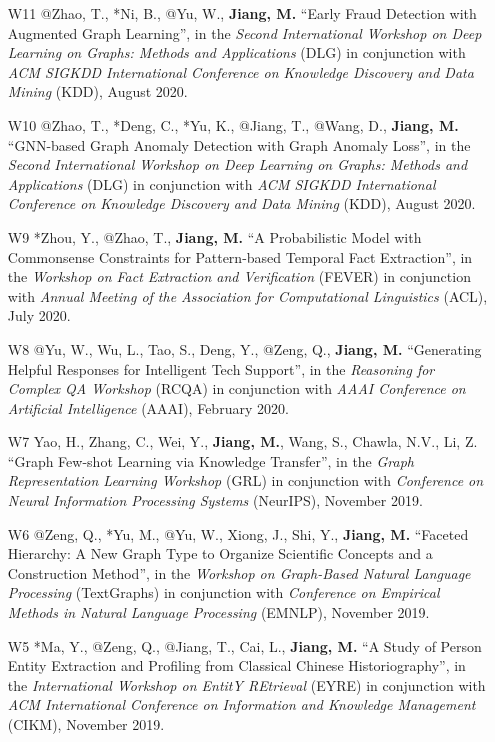\documentclass[10pt]{article}
\newenvironment{myindentpar}[1]%
{\begin{list}{}%
         {\setlength{\leftmargin}{#1}}%
         \item[]%
}
{\end{list}}
\newcounter{list}
\begin{document}
\begin{myindentpar}{0.00cm}
\begin{enumerate}[leftmargin=.5cm]
\item[W11] @Zhao, T., *Ni, B., @Yu, W., \textbf{Jiang, M.} ``Early Fraud Detection with Augmented Graph Learning'', in the \textit{Second International Workshop on Deep Learning on Graphs: Methods and Applications} (DLG) in conjunction with \textit{ACM SIGKDD International Conference on Knowledge Discovery and Data Mining} (KDD), August 2020.

\item[W10] @Zhao, T., *Deng, C., *Yu, K., @Jiang, T., @Wang, D., \textbf{Jiang, M.} ``GNN-based Graph Anomaly Detection with Graph Anomaly Loss'', in the \textit{Second International Workshop on Deep Learning on Graphs: Methods and Applications} (DLG) in conjunction with \textit{ACM SIGKDD International Conference on Knowledge Discovery and Data Mining} (KDD), August 2020.

\item[W9] *Zhou, Y., @Zhao, T., \textbf{Jiang, M.} ``A Probabilistic Model with Commonsense Constraints for Pattern-based Temporal Fact Extraction'', in the \textit{Workshop on Fact Extraction and Verification} (FEVER) in conjunction with \textit{Annual Meeting of the Association for Computational Linguistics} (ACL), July 2020.

\item[W8] @Yu, W., Wu, L., Tao, S., Deng, Y., @Zeng, Q., \textbf{Jiang, M.} ``Generating Helpful Responses for Intelligent Tech Support'', in the \textit{Reasoning for Complex QA  Workshop} (RCQA) in conjunction with \textit{AAAI Conference on Artificial Intelligence} (AAAI), February 2020.

\item[W7] Yao, H., Zhang, C., Wei, Y., \textbf{Jiang, M.}, Wang, S., Chawla, N.V., Li, Z. ``Graph Few-shot Learning via Knowledge Transfer'', in the \textit{Graph Representation Learning Workshop} (GRL) in conjunction with \textit{Conference on Neural Information Processing Systems} (NeurIPS), November 2019.
	
\item[W6] @Zeng, Q., *Yu, M., @Yu, W., Xiong, J., Shi, Y., \textbf{Jiang, M.} ``Faceted Hierarchy: A New Graph Type to Organize Scientific Concepts and a Construction Method'', in the \textit{Workshop on Graph-Based Natural Language Processing} (TextGraphs) in conjunction with \textit{Conference on Empirical Methods in Natural Language Processing} (EMNLP), November 2019.

\item[W5] *Ma, Y., @Zeng, Q., @Jiang, T., Cai, L., \textbf{Jiang, M.} ``A Study of Person Entity Extraction and Profiling from Classical Chinese Historiography'', in the \textit{International Workshop on EntitY REtrieval} (EYRE) in conjunction with \textit{ACM International Conference on Information and Knowledge Management} (CIKM), November 2019.


\end{enumerate}
\end{myindentpar}
\end{document}

